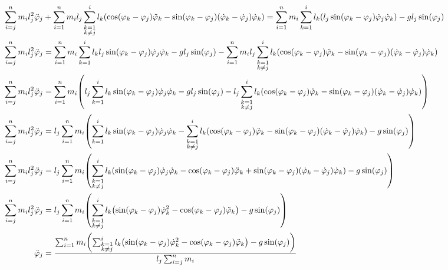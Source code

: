 \documentclass{article}
\renewcommand{\phi}{\varphi}
\begin{document}
\begin{align*}
  \sum_{i=j}^n m_i l_j^2 \ddot\phi_j &+ \sum_{i=1}^n m_i l_j \sum_{\substack{k=1\\k \neq j}}^i l_k \pqty{\cos(\phi_k - \phi_j) \ddot\phi_k - \sin(\phi_k - \phi_j)(\dot\phi_k - \dot\phi_j)\dot\phi_k} = \sum_{i=1}^n m_i \sum_{k=1}^i l_k \pqty{l_j \sin(\phi_k - \phi_j) \dot\phi_j \dot\phi_k} - g l_j \sin(\phi_j) \\
  \sum_{i=j}^n m_i l_j^2 \ddot\phi_j &= \sum_{i=1}^n m_i \sum_{k=1}^i l_k l_j \sin(\phi_k - \phi_j) \dot\phi_j \dot\phi_k - g l_j \sin(\phi_j) - \sum_{i=1}^n m_i l_j \sum_{\substack{k=1\\k \neq j}}^i l_k \pqty{\cos(\phi_k - \phi_j) \ddot\phi_k - \sin(\phi_k - \phi_j)(\dot\phi_k - \dot\phi_j)\dot\phi_k} \\
  \sum_{i=j}^n m_i l_j^2 \ddot\phi_j &= \sum_{i=1}^n m_i \pqty{ l_j\sum_{k=1}^i l_k \sin(\phi_k - \phi_j) \dot\phi_j \dot\phi_k - g l_j \sin(\phi_j) - l_j \sum_{\substack{k=1\\k \neq j}}^i l_k \pqty{\cos(\phi_k - \phi_j) \ddot\phi_k - \sin(\phi_k - \phi_j)(\dot\phi_k - \dot\phi_j)\dot\phi_k}} \\
  \sum_{i=j}^n m_i l_j^2 \ddot\phi_j &= l_j\sum_{i=1}^n m_i \pqty{\sum_{k=1}^i l_k \sin(\phi_k - \phi_j) \dot\phi_j \dot\phi_k - \sum_{\substack{k=1\\k \neq j}}^i l_k \pqty{\cos(\phi_k - \phi_j) \ddot\phi_k - \sin(\phi_k - \phi_j)(\dot\phi_k - \dot\phi_j)\dot\phi_k} - g\sin(\phi_j)} \\
  \sum_{i=j}^n m_i l_j^2 \ddot\phi_j &= l_j \sum_{i=1}^n m_i \pqty{\sum_{\substack{k=1\\k \neq j}}^i l_k \pqty{\sin(\phi_k - \phi_j) \dot\phi_j \dot\phi_k - \cos(\phi_k - \phi_j) \ddot\phi_k + \sin(\phi_k - \phi_j)(\dot\phi_k - \dot\phi_j)\dot\phi_k} - g \sin(\phi_j)} \\
  \sum_{i=j}^n m_i l_j^2 \ddot\phi_j &= l_j \sum_{i=1}^n m_i \pqty{\sum_{\substack{k=1\\k \neq j}}^i l_k \pqty{\sin(\phi_k - \phi_j) \dot\phi_k^2 - \cos(\phi_k - \phi_j) \ddot\phi_k} - g \sin(\phi_j)} \\
  \ddot\phi_j &= \frac{\sum_{i=1}^n m_i \pqty{\sum_{\substack{k=1\\k \neq j}}^i l_k \pqty{\sin(\phi_k - \phi_j) \dot\phi_k^2 - \cos(\phi_k - \phi_j) \ddot\phi_k} - g \sin(\phi_j)}}{l_j \sum_{i=j}^n m_i} \\
\end{align*}
\end{document}
